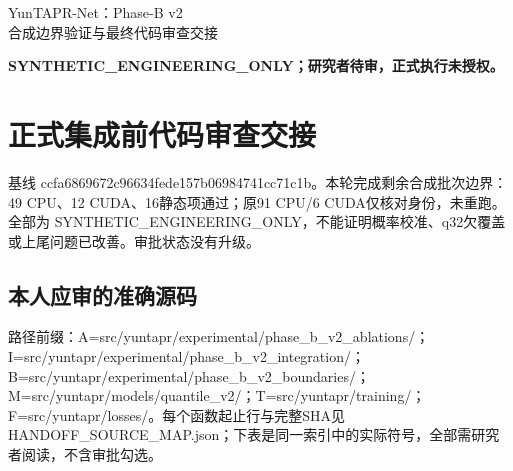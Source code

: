 \documentclass[UTF8,fontset=fandol,10pt]{ctexart}
\begin{document}
\begin{center}\Large YunTAPR-Net：Phase-B v2\\合成边界验证与最终代码审查交接
\end{center}
\noindent\textbf{SYNTHETIC\_ENGINEERING\_ONLY；研究者待审，正式执行未授权。}
\section{正式集成前代码审查交接}

基线 ccfa6869672c\allowbreak{}96634fede157\allowbreak{}b06984741cc7\allowbreak{}1c1b。本轮完成剩余合成批次边界：49 CPU、12 CUDA、16静态项通过；原91 CPU/\allowbreak{}6 CUDA仅核对身份，未重跑。全部为 SYNTHETIC\_\allowbreak{}ENGINEERING\_\allowbreak{}ONLY，不能证明概率校准、q32欠覆盖或上尾问题已改善。审批状态没有升级。

\subsection{本人应审的准确源码}

路径前缀：A=src/\allowbreak{}yuntapr/\allowbreak{}experimental/\allowbreak{}phase\_\allowbreak{}b\_\allowbreak{}v2\_\allowbreak{}ablations/\allowbreak{}；I=src/\allowbreak{}yuntapr/\allowbreak{}experimental/\allowbreak{}phase\_\allowbreak{}b\_\allowbreak{}v2\_\allowbreak{}integration/\allowbreak{}；B=src/\allowbreak{}yuntapr/\allowbreak{}experimental/\allowbreak{}phase\_\allowbreak{}b\_\allowbreak{}v2\_\allowbreak{}boundaries/\allowbreak{}；M=src/\allowbreak{}yuntapr/\allowbreak{}models/\allowbreak{}quantile\_\allowbreak{}v2/\allowbreak{}；T=src/\allowbreak{}yuntapr/\allowbreak{}training/\allowbreak{}；F=src/\allowbreak{}yuntapr/\allowbreak{}losses/\allowbreak{}。每个函数起止行与完整SHA见 HANDOFF\_\allowbreak{}SOURCE\_\allowbreak{}MAP.json；下表是同一索引中的实际符号，全部需研究者阅读，不含审批勾选。
\end{document}
